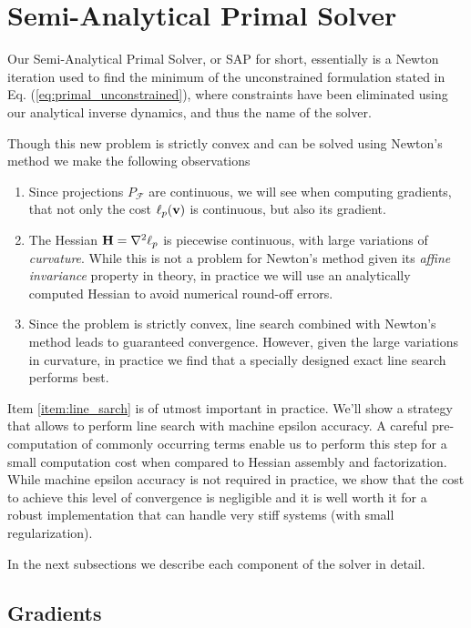 \section{Semi-Analytical Primal Solver}
\label{sec:sap_solver}

Our Semi-Analytical Primal Solver, or SAP for short, essentially is a Newton
iteration used to find the minimum of the unconstrained formulation stated in
Eq. (\ref{eq:primal_unconstrained}), where constraints have been eliminated
using our analytical inverse dynamics, and thus the name of the solver.

Though this new problem is strictly convex and can be solved using Newton's method
we make the following observations
\begin{enumerate}
	\item Since projections $P_\mathcal{F}$ are continuous, we will see when
	computing gradients, that not only the cost $\ell_p({\mathbf{v}})$ is continuous,
	but also its gradient.
	\item The Hessian ${\mathbf{H}}=\nabla^2\ell_p$ is piecewise continuous, with
	large variations of \textit{curvature}. While this is not a problem for
	Newton's method given its \textit{affine invariance} property in theory, in
	practice we will use an analytically computed Hessian to avoid numerical
	round-off errors.
	\item\label{item:line_sarch} Since the problem is strictly convex, line
	search combined with Newton's method leads to guaranteed convergence.
	However, given the large variations in curvature, in practice we find that a
	specially designed exact line search performs best.
\end{enumerate}

Item \ref{item:line_sarch} is of utmost important in practice. We'll show a
strategy that allows to perform line search with machine epsilon accuracy. A
careful pre-computation of commonly occurring terms enable us to perform this
step for a small computation cost when compared to Hessian assembly and
factorization. While machine epsilon accuracy is not required in practice, we
show that the cost to achieve this level of convergence is negligible and it is
well worth it for a robust implementation that can handle very stiff systems
(with small regularization).

In the next subsections we describe each component of the solver in detail.

\subsection{Gradients}
\label{sec:gradients}

